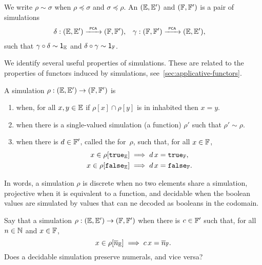 We write $\rho \sim \sigma$ when $\rho \preceq \sigma$ and $\sigma \preceq \rho$. An 
$({\mathbb{E}}, {\mathbb{E}'})$ and $({\mathbb{F}}, {\mathbb{F}'})$ is a pair of simulations
%
\begin{align*}
  \delta &: ({\mathbb{E}}, {\mathbb{E}'}) \xrightarrow{\scriptscriptstyle\mathsf{\ PCA\ }}{} ({\mathbb{F}}, {\mathbb{F}'}),
  &
  \gamma &: ({\mathbb{F}}, {\mathbb{F}'}) \xrightarrow{\scriptscriptstyle\mathsf{\ PCA\ }}{} ({\mathbb{E}}, {\mathbb{E}'}),
\end{align*}
%
such that $\gamma \circ \delta \sim \mathsf{1}_{\mathbb{E}}$ and $\delta \circ \gamma
\sim \mathsf{1}_{\mathbb{F}}$.

We identify several useful properties of simulations. These are related to the properties of functors induced by simulations, see~\cref{sec:applicative-functors}.


\begin{definition}
  A simulation $\rho: ({\mathbb{E}}, {\mathbb{E}'}) \to ({\mathbb{F}}, {\mathbb{F}'})$ is
  \begin{enumerate}
  \item {} when, for all $x, y \in {\mathbb{E}}$ if $\rho[x] \cap \rho[y]$ is in inhabited then
    $x = y$.

  \item {} when there is a single-valued
    simulation (a function) $\rho'$ such that $\rho' \sim \rho$.

  \item {} when there is $d \in {\mathbb{F}'}$,
    called the
     for~$\rho$, such that, for all $x \in
    {\mathbb{F}}$,
    \begin{align*}
      x \in \rho[\mathtt{true}_{\mathbb{E}}] &\implies d \, x = \mathtt{true}_{\mathbb{F}},
      \\
      x \in \rho[\mathtt{false}_{\mathbb{E}}] &\implies d \, x = \mathtt{false}_{\mathbb{F}}.
    \end{align*}
  \end{enumerate}
\end{definition}

In words, a simulation $\rho$ is discrete when no two elements share a simulation, projective when it is equivalent to a function, and decidable when the boolean values are simulated by values that can ne decoded as booleans in the codomain.

\begin{exercise}
  Say that a simulation $\rho: ({\mathbb{E}}, {\mathbb{E}'}) \to ({\mathbb{F}}, {\mathbb{F}'})$ 
  when there is $c \in {\mathbb{F}'}$ such that, for all $n \in \mathbb{N}$ and $x \in {\mathbb{F}}$,
  \begin{equation*}
    x \in \rho[\overline{n}_{\mathbb{E}}] \implies c \, x = \overline{n}_{\mathbb{F}}.
  \end{equation*}
  Does a decidable simulation preserve numerals, and vice versa?
\end{exercise}

